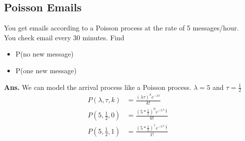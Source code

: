 \documentclass[11pt, a4paper]{article}
\begin{document}
    \subsection{Poisson Emails}
    You get emails according to a Poisson process at the rate of 5 messages/hour. You check email every 30 minutes. Find \newline
    \begin{itemize}
        \item P(no new message)
        \item P(one new message)
    \end{itemize}
    \textbf{Ans.} We can model the arrival process like a Poisson process. $\lambda = 5$ and $\tau = \frac{1}{2}$\\
    \begin{align*}
            P(\lambda, \tau, k) &= \frac{(\lambda \tau)^{k} e^{-\lambda \tau}}{k!} \\
            P(5, \frac{1}{2}, 0) &= \frac{(5 * \frac{1}{2})^{0} e^{-5 * \frac{1}{2}}}{0!} \\
            P(5, \frac{1}{2}, 1) &= \frac{(5 * \frac{1}{2})^{1} e^{-5 * \frac{1}{2}}}{1!}
    \end{align*}

\end{document}
